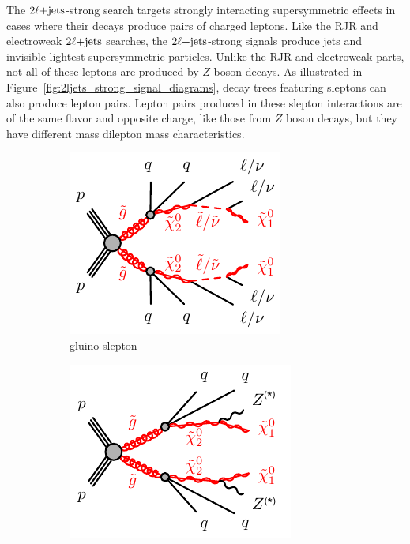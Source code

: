 The $2\ell\mathrm{+jets}$-strong search targets strongly interacting supersymmetric
effects in cases where their decays produce pairs of charged leptons.
Like the RJR and electroweak $2\ell\mathrm{+jets}$ searches, the $2\ell\mathrm{+jets}$-strong
signals produce jets and invisible lightest supersymmetric particles.
Unlike the RJR and electroweak parts, not all of these leptons are produced
by $Z$ boson decays.
As illustrated in Figure~\ref{fig:2ljets_strong_signal_diagrams}, decay trees
featuring sleptons can also produce lepton pairs.
Lepton pairs produced in these slepton interactions are of the same flavor
and opposite charge, like those from $Z$ boson decays, but they have different
mass dilepton mass characteristics.

\begin{figure}[tp]
\centering
\begin{subfigure}{0.45\textwidth}
    \centering
    \includegraphics[width=\textwidth]{figures/2ljets_strong_gogo_qqqqllllN1N1_N2.pdf}
    \caption{gluino-slepton}
\end{subfigure}
\hfill
\begin{subfigure}{0.47\textwidth}
    \centering
    \includegraphics[width=\textwidth]{figures/2ljets_strong_gogo_qqqqZZN1N1.pdf}

\end{subfigure}
\end{figure}
